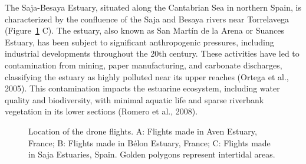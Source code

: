 \documentclass[
  letterpaper,
  DIV=11,
  numbers=noendperiod]{scrartcl}
\begin{document}
The Saja-Besaya Estuary, situated along the Cantabrian Sea in northern
Spain, is characterized by the confluence of the Saja and Besaya rivers
near Torrelavega (Figure~\ref{fig-location_sites} C). The estuary, also
known as San Martín de la Arena or Suances Estuary, has been subject to
significant anthropogenic pressures, including industrial developments
throughout the 20th century. These activities have led to contamination
from mining, paper manufacturing, and carbonate discharges, classifying
the estuary as highly polluted near its upper reaches (Ortega et al.,
2005). This contamination impacts the estuarine ecosystem, including
water quality and biodiversity, with minimal aquatic life and sparse
riverbank vegetation in its lower sections (Romero et al., 2008).

\label{cell-fig-location_sites}
\begin{figure}[H]


\caption{\label{fig-location_sites}Location of the drone flights. A:
Flights made in Aven Estuary, France; B: Flights made in Bélon Estuary,
France; C: Flights made in Saja Estuaries, Spain. Golden polygons
represent intertidal areas.}

\end{figure}%
\end{document}
